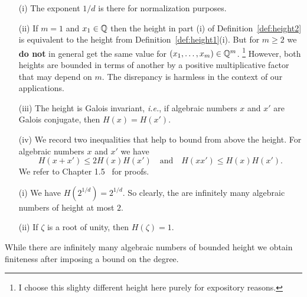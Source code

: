 \begin{remark}
  \label{rmk:heightprops}
  \begin{enumerate}
  \item [(i)] The exponent $1/d$ is there for normalization purposes.

  \item[(ii)] If $m=1$ and $x_1\in{\mathbb{Q}}$ then the height in part (i) of
    Definition~\ref{def:height2} is equivalent to the height from
    Definition~\ref{def:height1}(i). But for $m\ge 2$ we \textbf{do not} in
    general get the same value for $(x_1,\ldots,x_m)\in{\mathbb{Q}}^m$.
    \footnote{I choose this
      slighty different height here purely for expository reasons.}
    However, both heights are
    bounded in terms of another by a positive multiplicative factor that may
    depend on $m$.
    The disrepancy is harmless in the context of our applications.

  \item[(iii)] The height is Galois invariant, \textit{i.e.}, if
    algebraic numbers $x$
    and $x'$ are Galois conjugate, then $H(x)=H(x')$.

  \item[(iv)] We record two inequalities that help to bound from above
    the height. For algebraic numbers
    $x$ and $x'$ we have
    \begin{equation*}
      H(x+x')\le 2H(x)H(x')\quad\text{and}\quad H(xx')\le H(x)H(x').
    \end{equation*}
    We refer to Chapter 1.5~\cite{BG} for proofs.     
  \end{enumerate}
\end{remark}

\begin{example}
  \begin{enumerate}
  \item [(i)] We have $H(2^{1/d})=2^{1/d}$. So clearly, the are
    infinitely many algebraic numbers of height at most $2$. 

  \item[(ii)] If $\zeta$ is a root of unity, then $H(\zeta)=1$.
  \end{enumerate}
\end{example}

While  there are infinitely many algebraic numbers of
bounded height we obtain finiteness after imposing a bound on the
degree.

